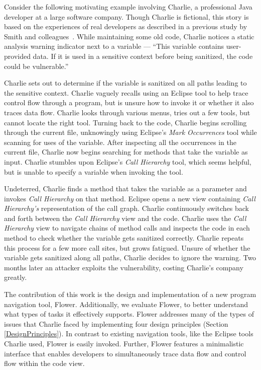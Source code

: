 \documentclass[conference]{IEEEtran}
\begin{document}

Consider the following motivating example involving Charlie, a professional Java developer at a large software company.
Though Charlie is fictional, this story is based on the experiences of real developers as described in a previous study by Smith and colleagues~\cite{Smith2015}.
While maintaining some old code, Charlie notices a static analysis warning indicator next to a variable --- ``This variable contains user-provided data. 
If it is used in a sensitive context before being sanitized, the code could be vulnerable.''

Charlie sets out to determine if the variable is sanitized on all paths leading to the sensitive context.
Charlie vaguely recalls using an Eclipse tool to help trace control flow through a program, but is unsure how to invoke it or whether it also traces data flow.
Charlie looks through various menus, tries out a few tools, but cannot locate the right tool.
Turning back to the code, Charlie begins scrolling through the current file, unknowingly using Eclipse's \emph{Mark Occurrences} tool while scanning for uses of the variable. 
After inspecting all the occurrences in the current file, Charlie now begins searching for methods that take the variable as input.
Charlie stumbles upon Eclipse's \emph{Call Hierarchy} tool, which seems helpful, but is unable to specify a variable when invoking the tool.

Undeterred, Charlie finds a method that takes the variable as a parameter and invokes \emph{Call Hierarchy} on that method.
Eclipse opens a new view containing \emph{Call Hierarchy's} representation of the call graph.
Charlie continuously switches back and forth between the \emph{Call Hierarchy} view and the code.
Charlie uses the \emph{Call Hierarchy} view to navigate chains of method calls and inspects the code in each method to check whether the variable gets sanitized correctly.
Charlie repeats this process for a few more call sites, but grows fatigued. 
Unsure of whether the variable gets sanitized along all paths, Charlie decides to ignore the warning.
Two months later an attacker exploits the vulnerability, costing Charlie's company greatly. 

The contribution of this work is the design and implementation of a new program navigation tool, Flower.
Additionally, we evaluate Flower, to better understand what types of tasks it effectively supports. 
Flower  addresses many of the types of issues that Charlie faced by implementing four design principles (Section \ref{DesignPrinciples}).
In contrast to existing navigation tools, like the Eclipse tools Charlie used, Flower is easily invoked. 
Further, Flower features a minimalistic interface that enables developers to simultaneously trace data flow and control flow within the code view. 
\end{document}
